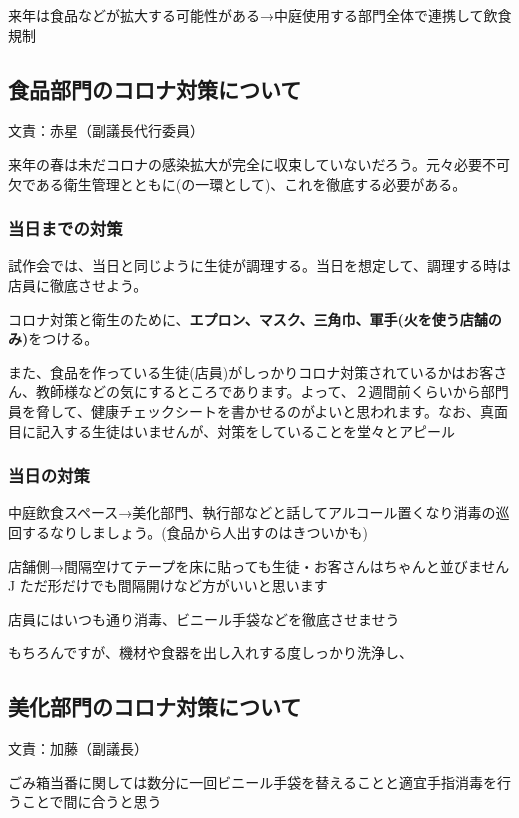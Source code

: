\documentclass[a4paper]{ltjsreport}
\begin{document}
来年は食品などが拡大する可能性がある→中庭使用する部門全体で連携して飲食規制

\subsection{食品部門のコロナ対策について} 文責：赤星（副議長代行委員） \vspace{2mm}

来年の春は未だコロナの感染拡大が完全に収束していないだろう。元々必要不可欠である衛生管理とともに(の一環として)、これを徹底する必要がある。

\subsubsection{当日までの対策}
試作会では、当日と同じように生徒が調理する。当日を想定して、調理する時は店員に徹底させよう。

コロナ対策と衛生のために、{\bfseries エプロン、マスク、三角巾、軍手(火を使う店舗のみ)}をつける。

また、食品を作っている生徒(店員)がしっかりコロナ対策されているかはお客さん、教師様などの気にするところであります。よって、２週間前くらいから部門員を脅して、健康チェックシートを書かせるのがよいと思われます。なお、真面目に記入する生徒はいませんが、対策をしていることを堂々とアピール


\subsubsection{当日の対策}
中庭飲食スペース→美化部門、執行部などと話してアルコール置くなり消毒の巡回するなりしましょう。(食品から人出すのはきついかも)

店舗側→間隔空けてテープを床に貼っても生徒・お客さんはちゃんと並びません^^

ただ形だけでも間隔開けなど方がいいと思います

店員にはいつも通り消毒、ビニール手袋などを徹底させませう

もちろんですが、機材や食器を出し入れする度しっかり洗浄し、


\subsection{美化部門のコロナ対策について} 文責：加藤（副議長） \vspace{2mm}

ごみ箱当番に関しては数分に一回ビニール手袋を替えることと適宜手指消毒を行うことで間に合うと思う
\end{document}
